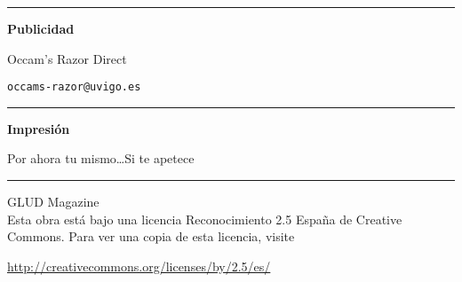\begin{textblock}{30}
\begin{minipage}{0.12\linewidth}
\begin{center}
\vspace{15.0mm}




\vspace{2mm}

\hrule

\vspace{4mm}

{\bf Publicidad}

\vspace{1mm}

Occam's Razor Direct

{\tt occams-razor@uvigo.es}

\vspace{2mm}

\hrule

\vspace{4mm}

{\bf Impresión}

Por ahora tu mismo\ldots Si te apetece

\vspace{2mm}

\hrule

\vspace{6mm}

 GLUD Magazine \\

Esta obra está bajo una licencia Reconocimiento 2.5 España de Creative
Commons. Para ver una copia de esta licencia, visite 

{\scriptsize \url{http://creativecommons.org/licenses/by/2.5/es/}} 

\end{center}
\end{minipage}

\end{textblock}

